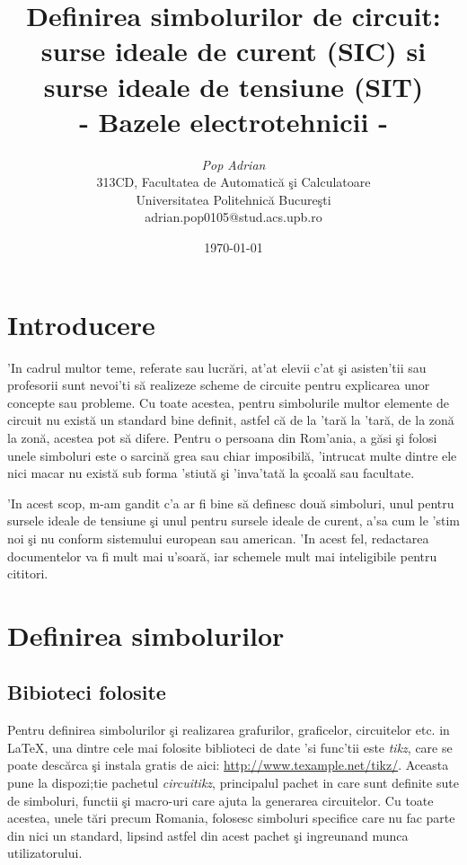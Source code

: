 \documentclass[12pt]{article}
\begin{document}
\title {Definirea simbolurilor de circuit: surse ideale de curent (SIC) si surse ideale de tensiune (SIT)\\
{\small - Bazele electrotehnicii - }}
\author{{\em Pop Adrian} \\
 313CD, Facultatea de Automatic\u{a} \c{s}i Calculatoare\\
 Universitatea Politehnic\u{a} Bucure\c{s}ti \\
 adrian.pop0105@stud.acs.upb.ro}
\date{\today}
\maketitle

\newpage
\maketitle
\tableofcontents

\newpage
\section{Introducere}
'In cadrul multor teme, referate sau lucr\u{a}ri, at'at elevii c'at \c{s}i asisten'tii sau profesorii sunt nevoi'ti s\u{a} realizeze scheme de circuite pentru explicarea unor concepte sau probleme. Cu toate acestea, pentru simbolurile multor elemente de circuit nu exist\u{a} un standard bine definit, astfel c\u{a} de la 'tar\u{a} la 'tar\u{a}, de la zon\u{a} la zon\u{a}, acestea pot s\u{a} difere. Pentru o persoana din Rom'ania, a g\u{a}si \c{s}i folosi unele simboluri este o sarcin\u{a} grea sau chiar imposibil\u{a}, 'intrucat multe dintre ele nici macar nu exist\u{a} sub forma 'stiut\u{a} \c{s}i 'inva'tat\u{a} la \c{s}coal\u{a} sau facultate.

'In acest scop, m-am gandit c'a ar fi bine s\u{a} definesc dou\u{a} simboluri, unul pentru sursele ideale de tensiune \c{s}i unul pentru sursele ideale de curent, a'sa cum le 'stim noi \c{s}i nu conform sistemului european sau american. 'In acest fel, redactarea documentelor va fi mult mai u'soar\u{a}, iar schemele mult mai inteligibile pentru cititori.

\section{Definirea simbolurilor}
\subsection{Bibioteci folosite}
Pentru definirea simbolurilor \c{s}i realizarea grafurilor, graficelor, circuitelor etc. in \LaTeX, una dintre cele mai folosite biblioteci de date 'si func'tii este \textit{tikz}, care se poate desc\u{a}rca \c{s}i instala gratis de aici: \url{http://www.texample.net/tikz/}. Aceasta pune la dispozi;tie pachetul \textit{circuitikz}, principalul pachet in care sunt definite sute de simboluri, functii \c{s}i macro-uri care ajuta la generarea circuitelor. Cu toate acestea, unele t\u{a}ri precum Romania, folosesc simboluri specifice care nu fac parte din nici un standard, lipsind astfel din acest pachet \c{s}i ingreunand munca utilizatorului.
\end{document}

